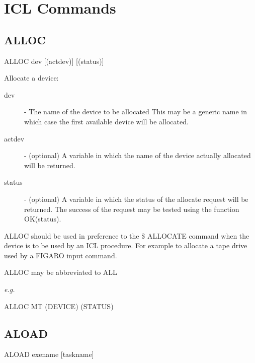 \documentclass[twoside,11pt,nolof,chapters]{starlink}
\begin{document}
\chapter{ICL Commands}

\section{ALLOC}



    ALLOC \hspace{.5cm} dev \hspace{.5cm} [(actdev)] \hspace{.5cm} [(status)]

    Allocate a device:
\begin{description}

\item[dev] - The name of the device to be allocated
            This may be a generic name in which case the first
            available device will be allocated.

\item[actdev] - (optional) A variable in which the name of the
            device actually allocated will be returned.

\item[status] - (optional) A variable in which the status of
            the allocate request will be returned. The success of
            the request may be tested using the function OK(status).

\end{description}

  ALLOC should be used in preference to the \$ ALLOCATE command when
  the device is to be used by an ICL procedure. For example to allocate
  a tape drive used by a FIGARO input command.

  ALLOC may be abbreviated to ALL

\emph{e.g. }
\begin{terminalv}
    ALLOC MT (DEVICE) (STATUS)
\end{terminalv}

\section{ALOAD\label{ALOAD}}


    ALOAD \hspace{.5cm} exename \hspace{.5cm} [taskname]
\end{document}
